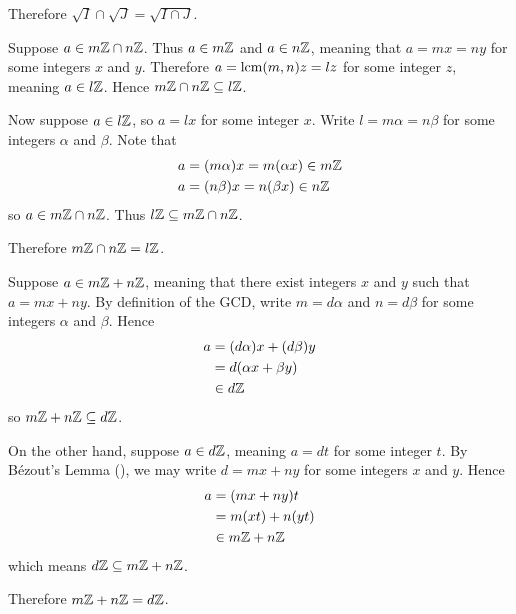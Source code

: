\begin{questions}
\begin{partquestions}{\alph*}
        Therefore $\sqrt{I}\cap\sqrt{J} = \sqrt{I\cap J}$.
    \end{partquestions}

    \item \begin{partquestions}{\alph*}
        \item Suppose $a \in m\mathbb{Z}\cap n\mathbb{Z}$. Thus $a \in m\mathbb{Z}$ and $a \in n\mathbb{Z}$, meaning that $a = mx = ny$ for some integers $x$ and $y$. Therefore $a = \mathrm{lcm}(m,n)z = lz$ for some integer $z$, meaning $a \in l\mathbb{Z}$. Hence $m\mathbb{Z} \cap n\mathbb{Z} \subseteq l\mathbb{Z}$.
        
        Now suppose $a \in l\mathbb{Z}$, so $a = lx$ for some integer $x$. Write $l = m\alpha = n\beta$ for some integers $\alpha$ and $\beta$. Note that
        \begin{align*}
            a &= (m\alpha)x = m(\alpha x) \in m\mathbb{Z}\\
            a &= (n\beta)x = n(\beta x) \in n\mathbb{Z}
        \end{align*}
        so $a \in m\mathbb{Z} \cap n\mathbb{Z}$. Thus $l\mathbb{Z} \subseteq m\mathbb{Z} \cap n\mathbb{Z}$.

        Therefore $m\mathbb{Z}\cap n\mathbb{Z} = l\mathbb{Z}$.

        \item Suppose $a \in m\mathbb{Z} + n\mathbb{Z}$, meaning that there exist integers $x$ and $y$ such that $a = mx + ny$. By definition of the GCD, write $m = d\alpha$ and $n = d\beta$ for some integers $\alpha$ and $\beta$. Hence
        \begin{align*}
            a &= (d\alpha)x + (d\beta)y\\
            &= d(\alpha x + \beta y)\\
            &\in d\mathbb{Z}
        \end{align*}
        so $m\mathbb{Z} + n\mathbb{Z} \subseteq d\mathbb{Z}$.

        On the other hand, suppose $a \in d\mathbb{Z}$, meaning $a = dt$ for some integer $t$. By B\'{e}zout's Lemma (), we may write $d = mx + ny$ for some integers $x$ and $y$. Hence
        \begin{align*}
            a &= (mx + ny)t\\
            &= m(xt) + n(yt)\\
            &\in m\mathbb{Z} + n\mathbb{Z}
        \end{align*}
        which means $d\mathbb{Z} \subseteq m\mathbb{Z} + n\mathbb{Z}$.

        Therefore $m\mathbb{Z} + n\mathbb{Z} = d\mathbb{Z}$.
    \end{partquestions}


\end{questions}
